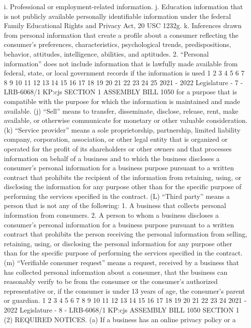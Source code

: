 i. Professional or employment-related information.
j. Education information that is not publicly available personally identifiable
information under the federal Family Educational Rights and Privacy Act, 20 USC
1232g.
k. Inferences drawn from personal information that create a profile about a
consumer reflecting the consumer's preferences, characteristics, psychological
trends, predispositions, behavior, attitudes, intelligence, abilities, and aptitudes.
2. “Personal information” does not include information that is lawfully made
available from federal, state, or local government records if the information is used
1
2
3
4
5
6
7
8
9
10
11
12
13
14
15
16
17
18
19
20
21
22
23
24
25
2021 - 2022 Legislature - 7 - LRB-6068/1
KP:cjs
SECTION 1 ASSEMBLY BILL 1050
for a purpose that is compatible with the purpose for which the information is
maintained and made available.
(j) “Sell” means to transfer, disseminate, disclose, release, rent, make available,
or otherwise communicate for monetary or other valuable consideration.
(k) “Service provider” means a sole proprietorship, partnership, limited
liability company, corporation, association, or other legal entity that is organized or
operated for the profit of its shareholders or other owners and that processes
information on behalf of a business and to which the business discloses a consumer's
personal information for a business purpose pursuant to a written contract that
prohibits the recipient of the information from retaining, using, or disclosing the
information for any purpose other than for the specific purpose of performing the
services specified in the contract.
(L) “Third party” means a person that is not any of the following:
1. A business that collects personal information from consumers.
2. A person to whom a business discloses a consumer's personal information
for a business purpose pursuant to a written contract that prohibits the person
receiving the personal information from selling, retaining, using, or disclosing the
personal information for any purpose other than for the specific purpose of
performing the services specified in the contract.
(m) “Verifiable consumer request” means a request, received by a business that
has collected personal information about a consumer, that the business can
reasonably verify to be from the consumer or the consumer's authorized
representative or, if the consumer is under 13 years of age, the consumer's parent or
guardian.
1
2
3
4
5
6
7
8
9
10
11
12
13
14
15
16
17
18
19
20
21
22
23
24
2021 - 2022 Legislature - 8 - LRB-6068/1
KP:cjs
 ASSEMBLY BILL 1050 SECTION 1
(2) REQUIRED NOTICES. (a) If a business has an online privacy policy or a
